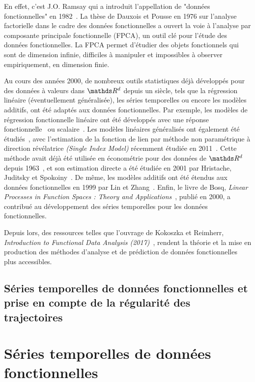 \smallskip

En effet, c'est J.O. Ramsay qui a introduit l'appellation de "données fonctionnelles" en 1982~\cite{ramsay1982data}. La thèse de Dauxois et Pousse en 1976 sur l'analyse factorielle dans le cadre des données fonctionnelles\cite{dauxois1976analyses} a ouvert la voie à l'analyse par composante principale fonctionnelle (FPCA), un outil clé pour l'étude des données fonctionnelles. La FPCA permet d'étudier des objets fonctionnels qui sont de dimension infinie, difficiles à manipuler et impossibles à observer empiriquement, en dimension finie.

\smallskip

Au cours des années 2000, de nombreux outils statistiques déjà développés pour des données à valeurs dans $\R d$ depuis un siècle, tels que la régression linéaire (éventuellement généralisée), les séries temporelles ou encore les modèles additifs, ont été adaptés aux données fonctionnelles. 
Par exemple, les modèles de régression fonctionnelle linéaire ont été développés avec une réponse fonctionnelle~\cite{ramsay1991some} ou scalaire~\cite{cardot1999functional}. 
Les modèles linéaires généralisés ont également été étudiés~\cite{james2002generalized,muller2005generalized}, avec l'estimation de la fonction de lien par méthode non paramétrique à direction révélatrice \emph{(Single Index Model)} récemment étudiée en 2011~\cite{chen2011single}. 
Cette méthode avait déjà été utilisée en économétrie pour des données de $\R d$ depuis 1963~\cite{sharpe1963simplified}, et son estimation directe a été étudiée en 2001 par Hristache, Juditsky et Spokoiny~\cite{hristache2001direct}. De même, les modèles additifs ont été étendus aux données fonctionnelles en 1999 par Lin et Zhang~\cite{lin1999inference}. 
Enfin, le livre de Bosq, \emph{\textcolor{flatuicolors_blue_devil}{Linear Processes in Function Spaces : Theory and Applications}}~\cite{bosq2000linear}, publié en 2000, a contribué au développement des séries temporelles pour les données fonctionnelles.

\smallskip

Depuis lors, des ressources telles que l'ouvrage de Kokoszka et Reimherr, \emph{\textcolor{flatuicolors_blue_devil}{Introduction to Functional Data Analysis (2017)}}~\cite{kokoszka2017introduction}, rendent la théorie et la mise en production des méthodes d'analyse et de prédiction de données fonctionnelles plus accessibles.
\subsection{Séries temporelles de données fonctionnelles et prise en compte de la régularité des trajectoires}

\section{Séries temporelles de données fonctionnelles}